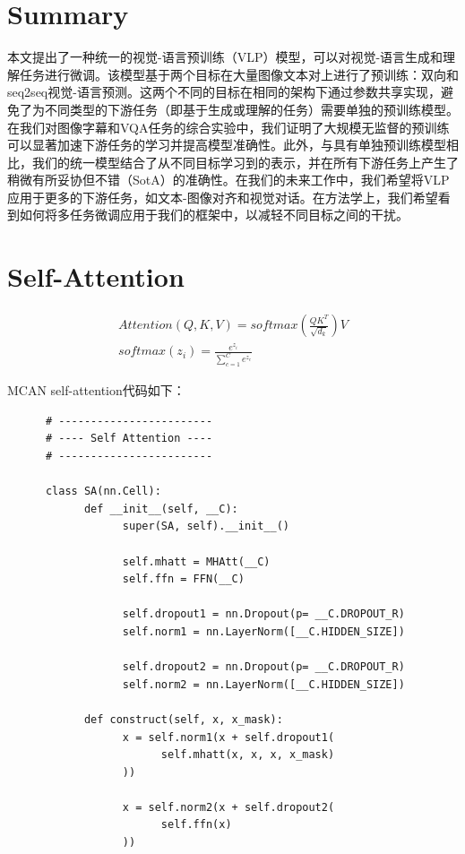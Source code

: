 \documentclass{article}
\begin{document}
\begin{sloppypar}
      \section{Summary}

      本文提出了一种统一的视觉-语言预训练（VLP）模型，可以对视觉-语言生成和理解任务进行微调。该模型基于两个目标在大量图像文本对上进行了预训练：双向和seq2seq视觉-语言预测。这两个不同的目标在相同的架构下通过参数共享实现，避免了为不同类型的下游任务（即基于生成或理解的任务）需要单独的预训练模型。在我们对图像字幕和VQA任务的综合实验中，我们证明了大规模无监督的预训练可以显著加速下游任务的学习并提高模型准确性。此外，与具有单独预训练模型相比，我们的统一模型结合了从不同目标学习到的表示，并在所有下游任务上产生了稍微有所妥协但不错（SotA）的准确性。在我们的未来工作中，我们希望将VLP应用于更多的下游任务，如文本-图像对齐和视觉对话。在方法学上，我们希望看到如何将多任务微调应用于我们的框架中，以减轻不同目标之间的干扰。

      \section{Self-Attention}

      \begin{gather}
            Attention(Q,K,V)=softmax(\frac{QK^T}{\sqrt{d_k}})V\\
            softmax(z_i)=\frac{e^{z_i}}{\sum_{c=1}^C e^{z_c}}
      \end{gather}

      MCAN self-attention代码如下：
      \begin{lstlisting}
      # ------------------------
      # ---- Self Attention ----
      # ------------------------

      class SA(nn.Cell):
            def __init__(self, __C):
                  super(SA, self).__init__()

                  self.mhatt = MHAtt(__C)
                  self.ffn = FFN(__C)

                  self.dropout1 = nn.Dropout(p= __C.DROPOUT_R)
                  self.norm1 = nn.LayerNorm([__C.HIDDEN_SIZE])

                  self.dropout2 = nn.Dropout(p= __C.DROPOUT_R)
                  self.norm2 = nn.LayerNorm([__C.HIDDEN_SIZE])

            def construct(self, x, x_mask):
                  x = self.norm1(x + self.dropout1(
                        self.mhatt(x, x, x, x_mask)
                  ))

                  x = self.norm2(x + self.dropout2(
                        self.ffn(x)
                  ))


\end{lstlisting}
\end{sloppypar}
\end{document}
